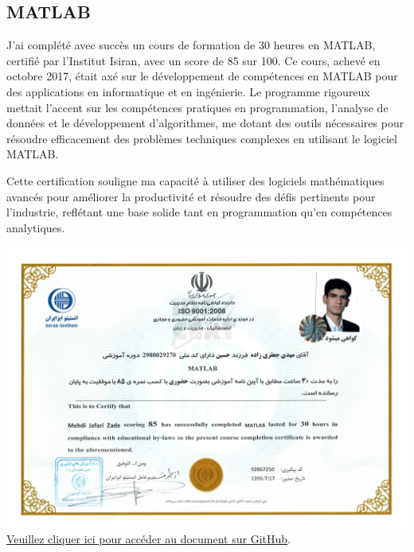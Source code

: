 \documentclass{article}
\begin{document}
    \subsection{MATLAB}
    J'ai complété avec succès un cours de formation de 30 heures en MATLAB, certifié par l'Institut Isiran, avec un score de 85 sur 100. Ce cours, achevé en octobre 2017, était axé sur le développement de compétences en MATLAB pour des applications en informatique et en ingénierie. Le programme rigoureux mettait l'accent sur les compétences pratiques en programmation, l'analyse de données et le développement d'algorithmes, me dotant des outils nécessaires pour résoudre efficacement des problèmes techniques complexes en utilisant le logiciel MATLAB.

    Cette certification souligne ma capacité à utiliser des logiciels mathématiques avancés pour améliorer la productivité et résoudre des défis pertinents pour l'industrie, reflétant une base solide tant en programmation qu'en compétences analytiques.
    \newline
    \newline
        \begin{center}
            \includegraphics[width=\textwidth,height=\textheight,keepaspectratio]{../Document/Certificates of Achievement/MATLAB/09-10-2017 attestation de logiciel de MATLAB.jpg}
            \footnotesize
             \href{https://github.com/jafarizadeh/CV---lettre/tree/00df58c41988ba7488536512caee235bdb5d570d/Document/Certificates%20of%20Achievement/MATLAB}{Veuillez cliquer ici pour accéder au document sur GitHub}.
        \end{center}
\end{document}
